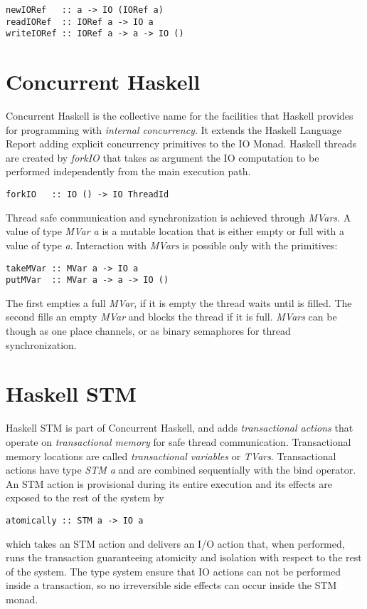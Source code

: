 \begin{lstlisting}
newIORef   :: a -> IO (IORef a)
readIORef  :: IORef a -> IO a
writeIORef :: IORef a -> a -> IO ()
\end{lstlisting}

\section{Concurrent Haskell}
Concurrent Haskell is the collective name for the facilities that Haskell provides for programming with \emph{internal concurrency}.
It extends the Haskell Language Report adding explicit concurrency primitives to the IO Monad.
Haskell threads are created by \emph{forkIO} that takes as argument the IO computation to be performed independently from the main execution path.
\begin{lstlisting}
forkIO   :: IO () -> IO ThreadId
\end{lstlisting}

Thread safe communication and synchronization is achieved through \emph{MVars}.
A value of type \emph{MVar a} is a mutable location that is either empty or full with a value of type \emph{a}.
Interaction with \emph{MVars} is possible only with the primitives:
\begin{lstlisting}
takeMVar :: MVar a -> IO a
putMVar  :: MVar a -> a -> IO ()
\end{lstlisting}
The first empties a full \emph{MVar}, if it is empty the thread waits until is filled. The second fills an empty \emph{MVar} and blocks the thread if it is full. \emph{MVars} can be though as one place channels, or as binary semaphores for thread synchronization.

\section{Haskell STM}

Haskell STM is part of Concurrent Haskell, and adds \emph{transactional actions} that operate on \emph{transactional memory} for safe thread communication. Transactional memory locations are called \emph{transactional variables} or \emph{TVars}.
Transactional actions have type \emph{STM a} and are combined sequentially with the bind operator.
An STM action is provisional during its entire execution and its effects are exposed to the rest of the system by 
\begin{lstlisting}
atomically :: STM a -> IO a
\end{lstlisting}
which takes an STM action and delivers an I/O action that, when performed, runs the transaction guaranteeing atomicity and isolation with respect to the rest of the system.
The type system ensure that IO actions can not be performed inside a transaction, so no irreversible side effects can occur inside the STM monad.

